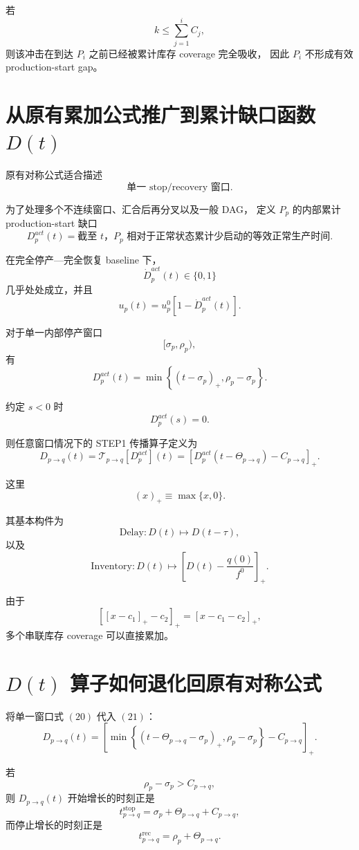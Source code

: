 \documentclass[UTF8,11pt]{ctexart}
\begin{document}
若
\[
k\le \sum_{j=1}^{i}C_j,
\]
则该冲击在到达 \(P_i\) 之前已经被累计库存 coverage 完全吸收，
因此 \(P_i\) 不形成有效 production-start gap。

\section{从原有累加公式推广到累计缺口函数 \(D(t)\)}

原有对称公式适合描述
\[
\boxed{\text{单一 stop/recovery 窗口}.}
\]

为了处理多个不连续窗口、汇合后再分叉以及一般 DAG，
定义 \(P_p\) 的内部累计 production-start 缺口
\[
\boxed{
D_p^{act}(t)
=
\text{截至 \(t\)，\(P_p\) 相对于正常状态累计少启动的等效正常生产时间}.
}
\tag{18}
\]

在完全停产---完全恢复 baseline 下，
\[
\dot D_p^{act}(t)\in\{0,1\}
\]
几乎处处成立，并且
\[
\boxed{
u_p(t)
=
u_p^0\left[1-\dot D_p^{act}(t)\right].
}
\tag{19}
\]

对于单一内部停产窗口
\[
[\sigma_p,\rho_p),
\]
有
\[
\boxed{
D_p^{act}(t)
=
\min\left\{
(t-\sigma_p)_+,
\rho_p-\sigma_p
\right\}.
}
\tag{20}
\]

约定 \(s<0\) 时
\[
D_p^{act}(s)=0.
\]

则任意窗口情况下的 STEP1 传播算子定义为
\[
\boxed{
D_{p\to q}(t)
=
\mathcal T_{p\to q}[D_p^{act}](t)
=
\left[
D_p^{act}(t-\Theta_{p\to q})
-
C_{p\to q}
\right]_+.
}
\tag{21}
\]

这里
\[
(x)_+\equiv\max\{x,0\}.
\]

其基本构件为
\[
\boxed{
\text{Delay}:D(t)\mapsto D(t-\tau),
}
\tag{22}
\]
以及
\[
\boxed{
\text{Inventory}:D(t)\mapsto
\left[D(t)-\frac{q(0)}{f^0}\right]_+.
}
\tag{23}
\]

由于
\[
[[x-c_1]_+-c_2]_+
=
[x-c_1-c_2]_+,
\]
多个串联库存 coverage 可以直接累加。

\section{\(D(t)\) 算子如何退化回原有对称公式}

将单一窗口式 \((20)\) 代入 \((21)\)：
\[
D_{p\to q}(t)
=
\left[
\min\left\{
(t-\Theta_{p\to q}-\sigma_p)_+,
\rho_p-\sigma_p
\right\}
-
C_{p\to q}
\right]_+.
\tag{24}
\]

若
\[
\rho_p-\sigma_p>C_{p\to q},
\]
则 \(D_{p\to q}(t)\) 开始增长的时刻正是
\[
\boxed{
t_{p\to q}^{\mathrm{stop}}
=
\sigma_p+\Theta_{p\to q}+C_{p\to q},
}
\]
而停止增长的时刻正是
\[
\boxed{
t_{p\to q}^{\mathrm{rec}}
=
\rho_p+\Theta_{p\to q}.
}
\]
\end{document}
